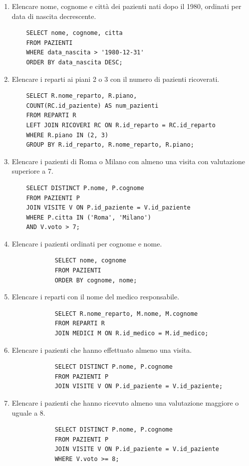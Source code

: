 \documentclass[a4paper,12pt]{article}
\begin{document}
	\begin{enumerate}
		
\item Elencare nome, cognome e città dei pazienti nati dopo
il 1980, ordinati per data di nascita decrescente.
\begin{verbatim}
	SELECT nome, cognome, citta
	FROM PAZIENTI
	WHERE data_nascita > '1980-12-31'
	ORDER BY data_nascita DESC;
\end{verbatim}

\item Elencare i reparti ai piani 2 o 3 con il numero
di pazienti ricoverati.
\begin{verbatim}
	SELECT R.nome_reparto, R.piano,
	COUNT(RC.id_paziente) AS num_pazienti
	FROM REPARTI R
	LEFT JOIN RICOVERI RC ON R.id_reparto = RC.id_reparto
	WHERE R.piano IN (2, 3)
	GROUP BY R.id_reparto, R.nome_reparto, R.piano;
\end{verbatim}

\item Elencare i pazienti di Roma o Milano con almeno
una visita con valutazione superiore a 7.
\begin{verbatim}
	SELECT DISTINCT P.nome, P.cognome
	FROM PAZIENTI P
	JOIN VISITE V ON P.id_paziente = V.id_paziente
	WHERE P.citta IN ('Roma', 'Milano')
	AND V.voto > 7;
\end{verbatim}
		
		\item Elencare i pazienti ordinati per cognome e nome.
		\begin{verbatim}
			SELECT nome, cognome
			FROM PAZIENTI
			ORDER BY cognome, nome;
		\end{verbatim}
		
		\item Elencare i reparti con il nome del medico responsabile.
		\begin{verbatim}
			SELECT R.nome_reparto, M.nome, M.cognome
			FROM REPARTI R
			JOIN MEDICI M ON R.id_medico = M.id_medico;
		\end{verbatim}
		
		\item Elencare i pazienti che hanno effettuato almeno una visita.
		\begin{verbatim}
			SELECT DISTINCT P.nome, P.cognome
			FROM PAZIENTI P
			JOIN VISITE V ON P.id_paziente = V.id_paziente;
		\end{verbatim}
		
		\item Elencare i pazienti che hanno ricevuto almeno una
		valutazione maggiore o uguale a 8.
		\begin{verbatim}
			SELECT DISTINCT P.nome, P.cognome
			FROM PAZIENTI P
			JOIN VISITE V ON P.id_paziente = V.id_paziente
			WHERE V.voto >= 8;
		\end{verbatim}
		

\end{enumerate}
\end{document}
